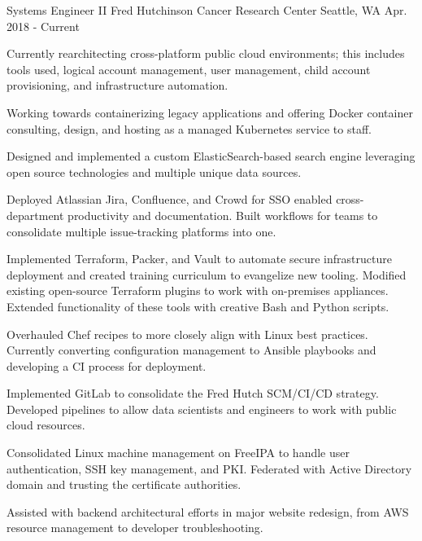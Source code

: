 


\begin{cventries}

\cventry
{Systems Engineer II} %
{Fred Hutchinson Cancer Research Center} %
{Seattle, WA} %
{Apr. 2018 - Current} %
{ %
\begin{cvitems}
\item {Currently rearchitecting cross-platform public cloud environments; this includes tools used, logical account management, user management, child account provisioning, and infrastructure automation.}
\item {Working towards containerizing legacy applications and offering Docker container consulting, design, and hosting as a managed Kubernetes service to staff.}
\item {Designed and implemented a custom ElasticSearch-based search engine leveraging open source technologies and multiple unique data sources.}
\item {Deployed Atlassian Jira, Confluence, and Crowd for SSO enabled cross-department productivity and documentation. Built workflows for teams to consolidate multiple issue-tracking platforms into one. }
\item {Implemented Terraform, Packer, and Vault to automate secure infrastructure deployment and created training curriculum to evangelize new tooling. Modified existing open-source Terraform plugins to work with on-premises appliances. Extended functionality of these tools with creative Bash and Python scripts.}
\item {Overhauled Chef recipes to more closely align with Linux best practices. Currently converting configuration management to Ansible playbooks and developing a CI process for deployment.}
\item {Implemented GitLab to consolidate the Fred Hutch SCM/CI/CD strategy. Developed pipelines to allow data scientists and engineers to work with public cloud resources.}
\item {Consolidated Linux machine management on FreeIPA to handle user authentication, SSH key management, and PKI. Federated with Active Directory domain and trusting the certificate authorities. }
\item {Assisted with backend architectural efforts in major website redesign, from AWS resource management to developer troubleshooting.}
\end{cvitems}
}


\end{cventries}
